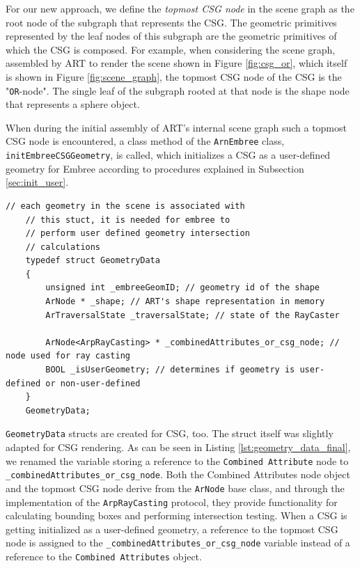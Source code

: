 For our new approach, we define the \emph{topmost CSG node} in the scene graph as the root node of the subgraph that represents the CSG. The geometric primitives represented by the leaf nodes of this subgraph are the geometric primitives of which the CSG is composed. For example, when considering the scene graph, assembled by ART to render the scene shown in Figure \ref{fig:csg_or}, which itself is shown in Figure \ref{fig:scene_graph}, the topmost CSG node of the CSG is the "\texttt{OR}-node". The single leaf of the subgraph rooted at that node is the shape node that represents a sphere object.

When during the initial assembly of ART's internal scene graph such a topmost CSG node is encountered, a class method of the \texttt{ArnEmbree} class, \texttt{initEmbreeCSGGeometry}, is called, which initializes  a CSG as a user-defined geometry for Embree according to procedures explained in Subsection \ref{sec:init_user}. 


\begin{listing} 
	\begin{lstlisting}[caption={Updated \texttt{GeometryData} struct for CSG rendering.}, label={lst:geometry_data_final}]
	// each geometry in the scene is associated with
	// this stuct, it is needed for embree to
	// perform user defined geometry intersection
	// calculations
	typedef struct GeometryData 
	{
		unsigned int _embreeGeomID; // geometry id of the shape
		ArNode * _shape; // ART's shape representation in memory
		ArTraversalState _traversalState; // state of the RayCaster
		
		ArNode<ArpRayCasting> * _combinedAttributes_or_csg_node; // node used for ray casting
		BOOL _isUserGeometry; // determines if geometry is user-defined or non-user-defined
	}
	GeometryData;
	\end{lstlisting}
\end{listing}

\texttt{GeometryData} structs are created for CSG, too. The struct itself was slightly adapted for CSG rendering. As can be seen in Listing \ref{lst:geometry_data_final}, we renamed the variable storing a reference to the \texttt{Combined Attribute} node to \texttt{\_combinedAttributes\_or\_csg\_node}. Both the Combined Attributes node object and the topmost CSG node derive from the \texttt{ArNode} base class, and through the implementation of the \texttt{ArpRayCasting} protocol, they provide functionality for calculating bounding boxes and performing intersection testing.
When a CSG is getting initialized as a user-defined geometry, a reference to the topmost CSG node is assigned to the
\texttt{\_combinedAttributes\_or\_csg\_node} variable instead of a reference to the \texttt{Combined Attributes} object.

